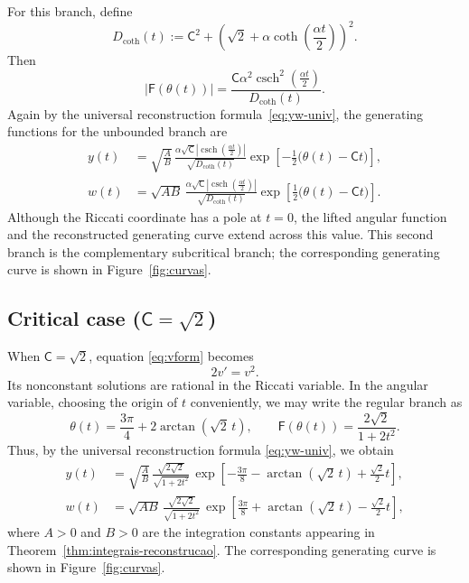 \documentclass[11pt,a4paper]{amsart}
\theoremstyle{plain}
\theoremstyle{remark}
\newcommand{\C}{\mathsf{C}}
\newcommand{\F}{\mathsf{F}}
\DeclareMathOperator{\csch}{csch}
\begin{document}
For this branch, define
\begin{equation}\label{eq:D-coth}
D_{\mathrm{coth}}(t)
:=
\C^{2}
+
\left(
\sqrt{2}
+
\alpha
\operatorname{coth}\left(\frac{\alpha t}{2}\right)
\right)^{2}.
\end{equation}
Then
\begin{equation}\label{eq:sub-F-coth}
|\F(\theta(t))|
=
\frac{
\C\alpha^{2}
\csch^{2}\left(\frac{\alpha t}{2}\right)}
{
D_{\mathrm{coth}}(t)
}.
\end{equation}
Again by the universal reconstruction formula~\eqref{eq:yw-univ}, the
generating functions for the unbounded branch are
\begin{equation}\label{eq:sub-yw-coth}
\boxed{\;
\begin{aligned}
y(t)
&=
\sqrt{\frac{A}{B}}\,
\frac{
\alpha\sqrt{\C}\left|\csch\left(\frac{\alpha t}{2}\right)\right|
}
{
\sqrt{D_{\mathrm{coth}}(t)}
}
\exp\left[
-\frac{1}{2}\bigl(\theta(t)-\C t\bigr)
\right],
\\[2pt]
w(t)
&=
\sqrt{AB}\,
\frac{
\alpha\sqrt{\C}
\left|\csch\left(\frac{\alpha t}{2}\right)\right|}
{
\sqrt{D_{\mathrm{coth}}(t)}
}
\exp\left[
\frac{1}{2}\bigl(\theta(t)-\C t\bigr)
\right].
\end{aligned}
\;}
\end{equation}
Although the Riccati coordinate has a pole at $t=0$, the lifted angular
function and the reconstructed generating curve extend across this value.
This second branch is the complementary subcritical branch; the corresponding
generating curve is shown in Figure~\ref{fig:curvas}.




\subsection{Critical case ($\C=\sqrt2$)}
\label{subsec:critico}

When $\C=\sqrt2$, equation \eqref{eq:vform} becomes
\[
2v'=v^2.
\]
Its nonconstant solutions are rational in the Riccati variable. In the angular
variable, choosing the origin of $t$ conveniently, we may write the regular
branch as
\begin{equation}\label{eq:crit-theta}
\theta(t)=\frac{3\pi}{4}+2\arctan(\sqrt2\,t),
\qquad
\F(\theta(t))=\frac{2\sqrt2}{1+2t^2}.
\end{equation}
Thus, by the universal reconstruction formula \eqref{eq:yw-univ}, we obtain
\begin{equation}\label{eq:crit-yw-general}
\boxed{\;
\begin{aligned}
y(t)
&=
\sqrt{\frac AB}\,
\frac{\sqrt{2\sqrt2}}{\sqrt{1+2t^2}}\,
\exp\!\left[
-\frac{3\pi}{8}
-\arctan(\sqrt2\,t)
+\frac{\sqrt2}{2}t
\right],
\\[2pt]
w(t)
&=
\sqrt{AB}\,
\frac{\sqrt{2\sqrt2}}{\sqrt{1+2t^2}}\,
\exp\!\left[
\frac{3\pi}{8}
+\arctan(\sqrt2\,t)
-\frac{\sqrt2}{2}t
\right],
\end{aligned}
\;}
\end{equation}
where $A>0$ and $B>0$ are the integration constants appearing in
Theorem~\ref{thm:integrais-reconstrucao}. The corresponding generating curve
is shown in Figure~\ref{fig:curvas}.
\end{document}
